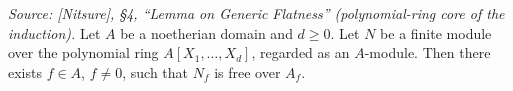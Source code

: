 \begin{lemma}
  \label{lem:gf_polynomial_core}
  \textit{Source: [Nitsure], \S4, ``Lemma on Generic Flatness'' (polynomial-ring
  core of the induction).}
  Let \(A\) be a noetherian domain and \(d \ge 0\). Let \(N\) be a finite module over
  the polynomial ring \(A[X_1, \dots, X_d]\), regarded as an \(A\)-module. Then there
  exists \(f \in A\), \(f \ne 0\), such that \(N_f\) is free over \(A_f\).

\end{lemma}

